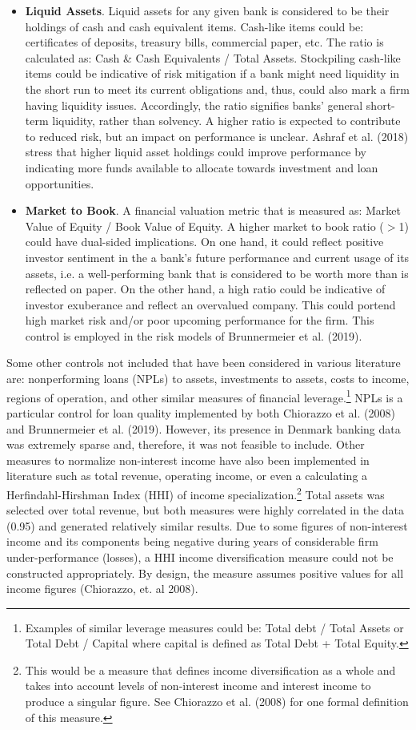 \documentclass[10pt]{article} %
\begin{document}
\begin{itemize}[label=$-$]
    \item \textbf{Liquid Assets}. Liquid assets for any given bank is considered to be their holdings of cash and cash equivalent items. Cash-like items could be: certificates of deposits, treasury bills, commercial paper, etc. The ratio is calculated as: Cash \& Cash Equivalents / Total Assets. Stockpiling cash-like items could be indicative of risk mitigation if a bank might need liquidity in the short run to meet its current obligations and, thus, could also mark a firm having liquidity issues. Accordingly, the ratio signifies banks' general short-term liquidity, rather than solvency. A higher ratio is expected to contribute to reduced risk, but an impact on performance is unclear. Ashraf et al. (2018) stress that
    higher liquid asset holdings could improve performance by indicating more funds available to allocate towards investment and loan opportunities. 
    \item \textbf{Market to Book}. A financial valuation metric that is measured as: Market Value of Equity / Book Value of Equity. A higher market to book ratio ($>$1) could have dual-sided implications. On one hand, it could reflect positive investor sentiment in the a bank's future performance and current usage of its assets, i.e. a well-performing bank that is considered to be worth more than is reflected on paper. On the other hand, a high ratio could be indicative of investor exuberance and reflect an overvalued company. This could portend high market risk and/or poor upcoming performance for the firm. This control is employed in the risk models of Brunnermeier et al. (2019).
\end{itemize}

Some other controls not included that have been considered in various literature are: nonperforming loans (NPLs) to assets, investments to assets, costs to income, regions of operation, and other similar measures of financial leverage.\footnote{Examples of similar leverage measures could be: Total debt / Total Assets or Total Debt / Capital where capital is defined as Total Debt + Total Equity.} NPLs is a particular control for loan quality implemented by both Chiorazzo et al. (2008) and Brunnermeier et al. (2019). However, its presence in Denmark banking data was extremely sparse and, therefore, it was not feasible to include. Other measures to normalize non-interest income have also been implemented in literature such as total revenue, operating income, or even a calculating a Herfindahl-Hirshman Index (HHI) of income specialization.\footnote{This would be a measure that defines income diversification as a whole and takes into account levels of non-interest income and interest income to produce a singular figure. See Chiorazzo et al. (2008) for one formal definition of this measure.} Total assets was selected over total revenue, but both measures were highly correlated in the data (0.95) and generated relatively similar results. Due to some figures of non-interest income and its components being negative during years of considerable firm under-performance (losses), a HHI income diversification measure could not be constructed appropriately. By design, the measure assumes positive values for all income figures (Chiorazzo, et. al 2008).
\end{document}
